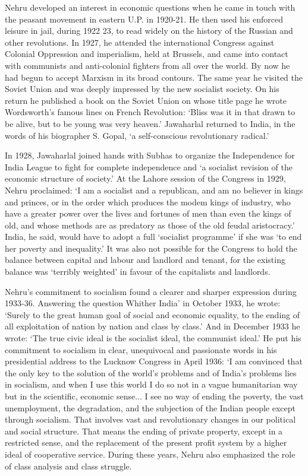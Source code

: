 Nehru developed an interest in economic questions when he came in touch with the peasant movement in eastern U.P. in 1920-21. He then used his enforced leisure in jail, during 1922­ 23, to read widely on the history of the Russian and other revolutions. In 1927, he attended the international Congress against Colonial Oppression and imperialism, held at Brussels, and came into contact with communists and anti-colonial fighters from all over the world. By now he had begun to accept Marxism in its broad contours. The same year he visited the Soviet Union and was deeply impressed by the new socialist society. On his return he published a book on the Soviet Union on whose title page he wrote Wordsworth's famous lines on French Revolution: `Bliss was it in that drawn to be alive, but to be young was very heaven.' Jawaharlal returned to India, in the words of his biographer S. Gopal, `a self-conscious revolutionary radical.' 

In 1928, Jawaharlal joined hands with Subhas to organize the Independence for India League to fight for complete independence and `a socialist revision of the economic structure of society.' At the Lahore session of the Congress in 1929, Nehru proclaimed: `I am a socialist and a republican, and am no believer in kings and princes, or in the order which produces the modem kings of industry, who have a greater power over the lives and fortunes of men than even the kings of old, and whose methods are as predatory as those of the old feudal aristocracy.' India, he said, would have to adopt a full `socialist programme' if she was `to end her poverty and inequality.' It was also not possible for the Congress to hold the balance between capital and labour and landlord and tenant, for the existing balance was `terribly weighted' in favour of the capitalists and landlords. 

Nehru's commitment to socialism found a clearer and sharper expression during 1933-36. Answering the question Whither India' in October 1933, he wrote: `Surely to the great human goal of social and economic equality, to the ending of all exploitation of nation by nation and class by class.' And in December 1933 he wrote: `The true civic ideal is the socialist ideal, the communist ideal.' He put his commitment to socialism in clear, unequivocal and passionate words in his presidential address to the Lucknow Congress in April 1936: `I am convinced that the only key to the solution of the world's problems and of India's problems lies in socialism, and when I use this world I do so not in a vague humanitarian way but in the scientific, economic sense... I see no way of ending the poverty, the vast unemployment, the degradation, and the subjection of the Indian people except through socialism. That involves vast and revolutionary changes in our political and social structure. That means the ending of private property, except in a restricted sense, and the replacement of the present profit system by a higher ideal of cooperative service. During these years, Nehru also emphasized the role of class analysis and class struggle. 

